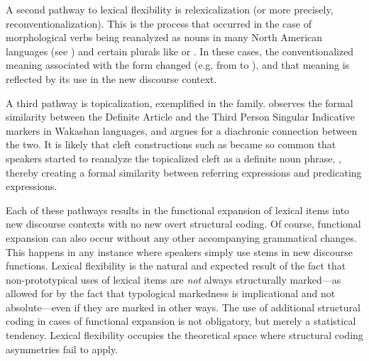 A second pathway to lexical flexibility is relexicalization (or more precisely, reconventionalization). This is the process that occurred in the case of morphological verbs being reanalyzed as nouns in many North American languages (see ) and certain  plurals like  or . In these cases, the conventionalized meaning associated with the form changed (e.g. from   to ), and that meaning is reflected by its use in the new discourse context.

A third pathway is topicalization, exemplified in the  family. \textcite[122, 142]{Jacobsen1979} observes the formal similarity between the Definite Article and the Third Person Singular Indicative markers in Wakashan languages, and argues for a diachronic connection between the two. It is likely that cleft constructions such as  became so common that speakers started to reanalyze the topicalized cleft as a definite noun phrase, , thereby creating a formal similarity between referring expressions and predicating expressions.

Each of these pathways results in the functional expansion of lexical items into new discourse contexts with no new overt structural coding. Of course, functional expansion can also occur without any other accompanying grammatical changes. This happens in any instance where speakers simply use stems in new discourse functions. Lexical flexibility is the natural and expected result of the fact that non-prototypical uses of lexical items are \emph{not} always structurally marked—as allowed for by the fact that typological markedness is implicational and not absolute—even if they are marked in other ways. The use of additional structural coding in cases of functional expansion is not obligatory, but merely a statistical tendency. Lexical flexibility occupies the theoretical space where structural coding asymmetries fail to apply.

